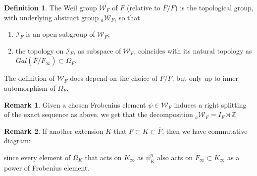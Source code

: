\documentclass[12pt,a4paper,english]{article}
\theoremstyle{definition}
\newtheorem{defi}{Definition}[section]
\newtheorem*{rem}{Remark}
\theoremstyle{plain}
\begin{document}
\begin{defi}
The Weil group $\mathcal{W}_{F}$ of $F$ (relative to $\overline{F}/F$) is the topological group, with underlying abstract group $_{a}\mathcal{W}_{F}$, so that 
\begin{enumerate}
    \item $\mathcal{I}_{F}$ is an open subgroup of $\mathcal{W}_{F}$;
    \item the topology on $\mathcal{I}_{F}$, as subspace of $\mathcal{W}_{F}$, coincides with its natural topology as $Gal(\overline{F}/F_{\infty})\subset\Omega_{F}$.
\end{enumerate}
The definition of $\mathcal{W}_{F}$ does depend on the choice of $\overline{F}/F$, but only up to inner automorphism of $\Omega_{F}$.
\end{defi}
\begin{rem}
Given a chosen Frobenius element $\psi\in \mathcal{W}_{F}$ induces a right splitting of the exact sequence as above. we get that the decomposition $_{a}\mathcal{W}_{F}=I_{F}\rtimes \mathbb{Z}$
\end{rem}
\begin{rem}
If another extension $K$ that $F\subset K\subset\overline{F}$, then we have commutative diagram:
\begin{center}


\end{center}
since every element of $\Omega_{K}$ that acts on $K_{\infty}$ as $\psi^{n}_{K}$ also acts on $F_{\infty}\subset K_{\infty}$ as a power of Frobenius element.

\end{rem}
\end{document}
